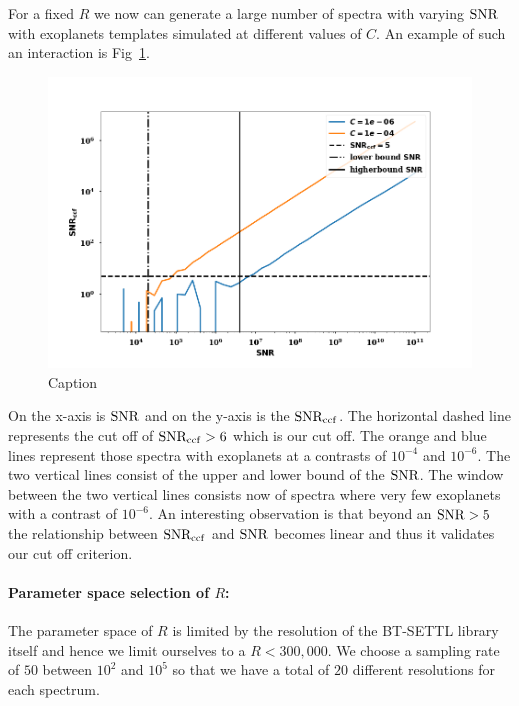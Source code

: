 For a fixed $R$ we now can generate a large number of spectra with varying $\rm{SNR}$ with exoplanets templates simulated at different values of $C$.
An example of such an interaction is Fig~\ref{fig:parspace-1}. 
\begin{figure}[!ht]
    \centering
    \includegraphics[scale =0.5]{images/Chapter3/parspace_new.png}
    \caption{Caption}
    \label{fig:parspace-1}
\end{figure}
On the x-axis is $\rm{SNR}$ and on the y-axis is the $\rm{SNR_{ccf}}$. 
The horizontal dashed line represents the cut off of $\rm{SNR_{ccf}}>6$ which is our cut off.
The orange and blue lines represent those spectra with exoplanets at a contrasts of $10^{-4}$ and $10^{-6}$.
The two vertical lines consist of the upper and lower bound of the $\rm{SNR}$. 
The window between the two vertical lines consists now of spectra where very few exoplanets with a contrast of $10^{-6}$.
An interesting observation is that beyond an $\rm{SNR}>5$ the relationship between $\rm{SNR_{ccf}}$ and $\rm{SNR}$ becomes linear and thus it validates our cut off criterion.

\paragraph{Parameter space selection of $R$:\\}
The parameter space of $R$ is limited by the resolution of the \textsc{BT-SETTL} library itself and hence we limit ourselves to a $R<300,000$. 
We choose a sampling rate of $50$ between $10^{2}$ and $10^{5}$ so that we have a total of $20$ different resolutions for each spectrum.

